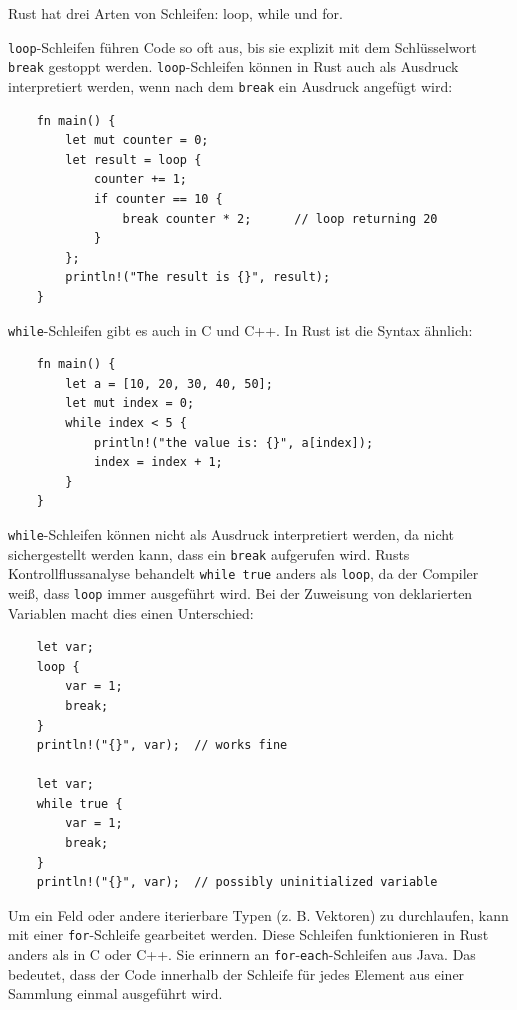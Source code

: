 Rust hat drei Arten von Schleifen: loop, while und for.

\verb"loop"-Schleifen führen Code so oft aus, bis sie explizit mit dem Schlüsselwort \verb"break" gestoppt werden. \verb"loop"-Schleifen können in Rust auch als Ausdruck interpretiert werden, wenn nach dem \verb"break" ein Ausdruck angefügt wird:

\begin{lstlisting}
    fn main() {
        let mut counter = 0;
        let result = loop {
            counter += 1;
            if counter == 10 {
                break counter * 2;      // loop returning 20
            }
        };
        println!("The result is {}", result);
    }
\end{lstlisting}

\newpage

\verb"while"-Schleifen gibt es auch in C und C++. In Rust ist die Syntax ähnlich:

\begin{lstlisting}
    fn main() {
        let a = [10, 20, 30, 40, 50];
        let mut index = 0;
        while index < 5 {
            println!("the value is: {}", a[index]);
            index = index + 1;
        }
    }
\end{lstlisting}

\verb"while"-Schleifen können nicht als Ausdruck interpretiert werden, da nicht si\-cher\-ge\-stellt werden kann, dass ein \verb"break" aufgerufen wird. Rusts Kontrollflussanalyse behandelt \verb"while true" anders als \verb"loop", da der Compiler weiß, dass \verb"loop" immer ausgeführt wird. Bei der Zuweisung von deklarierten Variablen macht dies einen Unterschied:

\begin{lstlisting}
    let var;
    loop {
        var = 1;
        break;
    }
    println!("{}", var);  // works fine

    let var;
    while true {
        var = 1;
        break;
    }
    println!("{}", var);  // possibly uninitialized variable
\end{lstlisting}

Um ein Feld oder andere iterierbare Typen (z. B. Vektoren) zu durchlaufen, kann mit einer \verb"for"-Schleife gearbeitet werden. Diese Schleifen funktionieren in Rust anders als in C oder C++. Sie erinnern an \verb"for"-\verb"each"-Schleifen aus Java. Das be\-deu\-tet, dass der Code innerhalb der Schleife für jedes Element aus einer Sammlung einmal ausgeführt wird.

\newpage

